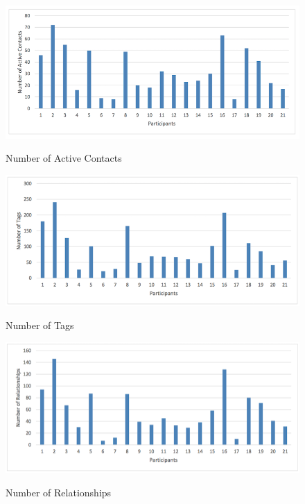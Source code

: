 \begin{figure}[!htbp]
\begin{centering}
\includegraphics[scale=0.5]{pics/active_contacts.png}
\caption{Number of Active Contacts}\label{fig:active_contacts}
\includegraphics[scale=0.5]{pics/tags_total.png}
\caption{Number of Tags}\label{fig:tags_total}
\includegraphics[scale=0.5]{pics/relationships_total.png}
\caption{Number of Relationships}\label{fig:relationships_total}
\end{centering}
\end{figure}

